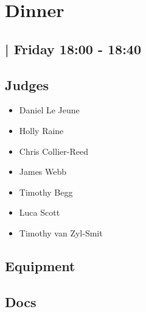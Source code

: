 \documentclass[10pt]{article}
\begin{document}
		\begin{minipage}{\linewidth}
		\setcounter{section}{4}
	\section{Dinner  }
	\subsection*{ | Friday 18:00 - 18:40}

	

	\begin{multicols}{2}
	\subsection*{\faUsers \: Judges}
	\begin{itemize}
			\item Daniel Le Jeune
			\item Holly Raine
			\item Chris Collier-Reed
			\item James Webb
			\item Timothy Begg
			\item Luca Scott
			\item Timothy van Zyl-Smit
		\end{itemize}
	\columnbreak
	\subsection*{\faWrench \: Equipment}
	        \vfill\null
        \subsection*{\faFile \: Docs}
     	\end{multicols}


	\vspace{1cm}
	\end{minipage}
\end{document}
